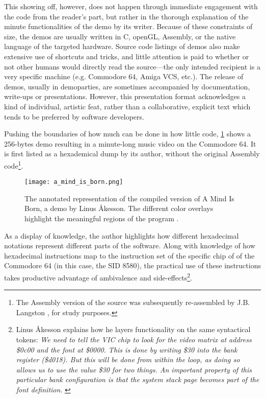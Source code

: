 This showing off, however, does not happen through immediate engagement with the code from the reader's part, but rather in the thorough explanation of the minute functionalities of the demo by its writer. Because of these constraints of size, the demos are usually written in C, openGL, Assembly, or the native language of the targeted hardware. Source code listings of demos also make extensive use of shortcuts and tricks, and little attention is paid to whether or not other humans would directly read the source—the only intended recipient is a very specific machine (e.g. Commodore 64, Amiga VCS, etc.). The release of demos, usually in demoparties, are sometimes accompanied by documentation, write-ups or presentations. However, this presentation format acknowledges a kind of individual, artistic feat, rather than a collaborative, explicit text which tends to be preferred by software developers.

Pushing the boundaries of how much can be done in how little code, \ref{graphic:a_mind_is_born} shows a 256-bytes demo resulting in a minute-long music video \citep{akesson_mind_2017} on the Commodore 64. It is first listed as a hexademical dump by its author, without the original Assembly code\footnote{The Assembly version of the source was subsequently re-assembled by J.B. Langston \citep{langston_mind_2017}, for study purposes.}.

\begin{figure}
  \texttt{[image: a\_mind\_is\_born.png]}
  \caption{The annotated representation of the compiled version of A Mind Is Born, a demo by Linus Åkesson. The different color overlays highlight the meaningful regions of the program \citep{akesson_mind_2017}.}
  \label{graphic:a_mind_is_born}
\end{figure}

As a display of knowledge, the author highlights how different hexadecimal notations represent different parts of the software. Along with knowledge of how hexadecimal instructions map to the instruction set of the specific chip of of the Commodore 64 (in this case, the SID 8580), the practical use of these instructions takes productive advantage of ambivalence and side-effects\footnote{Linus Åkesson explains how he layers functionality on the same syntactical tokens: \emph{We need to tell the VIC chip to look for the video matrix at address \$0c00 and the font at \$0000. This is done by writing \$30 into the bank register (\$d018). But this will be done from within the loop, as doing so allows us to use the value \$30 for two things. An important property of this particular bank configuration is that the system stack page becomes part of the font definition}. \citep{akesson_mind_2017}}.

